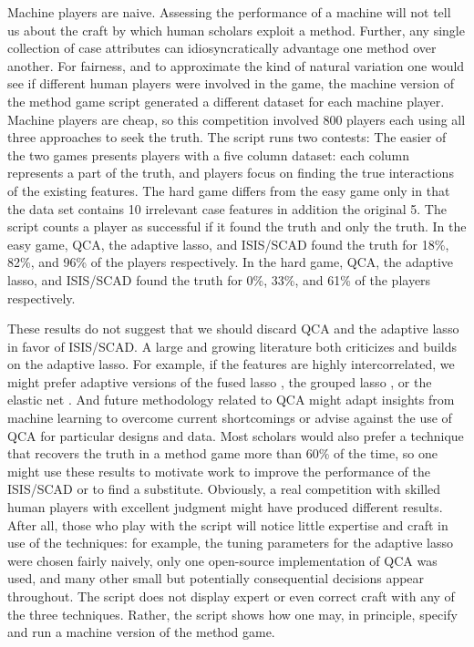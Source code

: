 \documentclass[12pt]{article}
\begin{document}
Machine players are naive. Assessing the performance of a machine will not
tell us about the craft by which human scholars exploit a method.  Further,
any single collection of case attributes can idiosyncratically advantage one
method over another. For fairness, and to approximate the kind of natural
variation one would see if different human players were involved in the game,
the machine version of the method game script generated a different dataset
for each machine player.  Machine players are cheap, so this competition
involved 800 players each using all three approaches to seek the truth.  The
script runs two contests: The easier of the two games presents players with a
five column dataset: each column represents a part of the truth, and players
focus on finding the true interactions of the existing features.  The hard
game differs from the easy game only in that the data set contains 10
irrelevant case features in addition the original 5.  The script counts a
player as successful if it found the truth and only the truth. In the easy
game, QCA, the adaptive lasso, and ISIS/SCAD found the truth for 18\%, 82\%,
and 96\% of the players respectively. In the hard game, QCA, the adaptive
lasso, and ISIS/SCAD found the truth for 0\%, 33\%, and 61\% of the players
respectively.

These results do not suggest that we should discard QCA and the adaptive lasso
in favor of ISIS/SCAD.  A large and growing literature both criticizes and
builds on the adaptive lasso. For example, if the features are highly
intercorrelated, we might prefer adaptive versions of the fused lasso
\citep{rinaldo2009properties}, the grouped lasso \citep{wang2008note}, or the
elastic net \citep{ghosh2011grouped, zou2004regression}. And future
methodology related to QCA might adapt insights from machine learning to
overcome current shortcomings or advise against the use of QCA for particular
designs and data.  Most scholars would also prefer a technique
that recovers the truth in a method game more than 60\% of the time, so one might
use these results to motivate work to improve the performance of the ISIS/SCAD
or to find a substitute. Obviously, a real competition with skilled human players
with excellent judgment might have produced different results.  After all,
those who play with the script will notice little expertise and craft in use
of the techniques: for example, the tuning parameters for the adaptive lasso
were chosen fairly naively, only one open-source implementation of QCA was
used, and many other small but potentially consequential decisions appear
throughout.  The script does not display expert or even correct craft with any
of the three techniques.  Rather, the script shows how one may, in principle,
specify and run a machine version of the method game.
\end{document}
